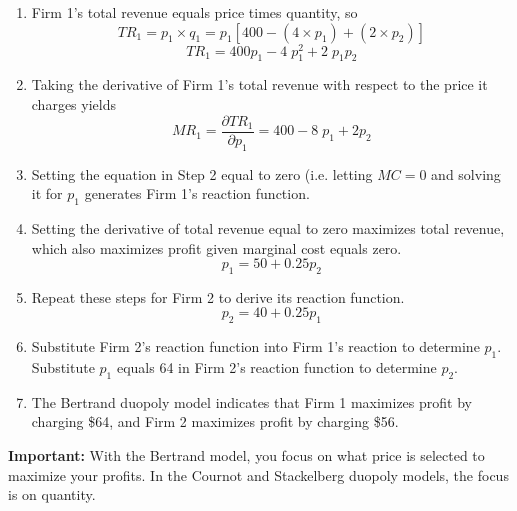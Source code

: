 \documentclass[a4paper,12pt]{article}
\begin{document}
\begin{enumerate}
\item 

Firm 1’s total revenue equals price times quantity, so
\[TR_{1} = p_1 \times q_1 = p_1[400 - (4\times p_1)  + (2 \times p_2)]\]
\[TR_{1} = 400p_1 - 4\;p_1^2  + 2\;p_1 p_2\]

\item Taking the derivative of Firm 1’s total revenue with respect to the price it charges yields
\[MR_{1} = \frac{\partial TR_{1}}{\partial p_1} = 400 - 8\;p_1  + 2 p_2\]

\item Setting the equation in Step 2 equal to zero (i.e. letting $MC=0$ and solving it for $p_1$ generates Firm 1’s reaction function.
\item Setting the derivative of total revenue equal to zero maximizes total revenue, which also maximizes profit given marginal cost equals zero.
\[p_1 = 50 + 0.25p_2\]

\item Repeat these steps for Firm 2 to derive its reaction function.
\[p_2 = 40+ 0.25p_1\]

\item Substitute Firm 2’s reaction function into Firm 1’s reaction to determine $p_1$.
Substitute $p_1$ equals 64 in Firm 2’s reaction function to determine $p_2$.

\item The Bertrand duopoly model indicates that Firm 1 maximizes profit by charging \$64, and Firm 2 maximizes profit by charging \$56. 
\end{enumerate}


\noindent \textbf{Important:} With the Bertrand model, you focus on what price is selected to maximize your profits. In the Cournot and Stackelberg duopoly models, the focus is on quantity.
\end{document}

